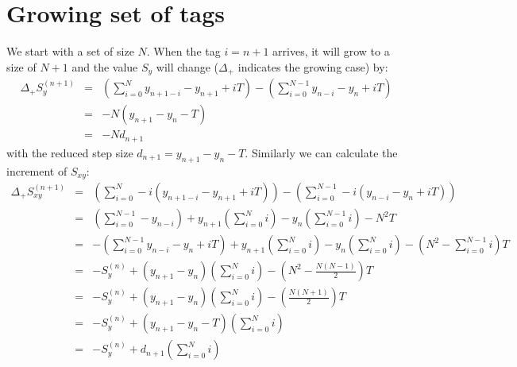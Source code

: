 \documentclass[]{scrreprt}
\begin{document}
\section{Growing set of tags}
We start with a set of size $N$. When the tag $i=n+1$ arrives, it will grow to a size of $N+1$ and the value $S_y$ will change ($\Delta_+$ indicates the growing case) by:
\begin{eqnarray}
    \Delta_+ S_y^{(n+1)} &=& \left(\sum_{i=0}^N y_{n + 1 - i} - y_{n+1} + i T\right) - \left(\sum_{i=0}^{N-1} y_{n - i} - y_n + i T\right) \label{eq:DeltaPlus_S_y_explicit} \\
    &=& - N \left(y_{n+1} - y_n - T\right) \nonumber \\
    &=& - N d_{n+1}
\end{eqnarray}
with the reduced step size $d_{n+1} = y_{n+1} - y_n - T$. Similarly we can calculate the increment of $S_{xy}$:
\begin{eqnarray}
    \Delta_+ S_{xy}^{(n+1)} &=& \left(\sum_{i=0}^N -i \left(y_{n + 1 - i} - y_{n+1} + i T\right)\right) - \left(\sum_{i=0}^{N-1} -i \left(y_{n - i} - y_n + i T\right)\right) \label{eq:DeltaPlus_S_xy_explicit} \\
    &=& \left(\sum_{i=0}^{N-1}-y_{n-i}\right) + y_{n+1} \left(\sum_{i=0}^N i\right) - y_n \left(\sum_{i=0}^{N-1} i\right) - N^2 T \nonumber \\
    &=& -\left(\sum_{i=0}^{N-1} y_{n-i} - y_n + iT\right) + y_{n+1} \left(\sum_{i=0}^N i\right) - y_n \left(\sum_{i=0}^N i\right) - \left(N^2 - \sum_{i=0}^{N-1} i\right) T \nonumber \\
    &=& -S_y^{(n)} + \left(y_{n+1} - y_n\right) \left(\sum_{i=0}^N i\right) - \left(N^2 - \frac{N(N-1)}{2}\right) T \nonumber \\
    &=& -S_y^{(n)} + \left(y_{n+1} - y_n\right) \left(\sum_{i=0}^N i\right) - \left(\frac{N(N+1)}{2}\right) T \nonumber \\
    &=& -S_y^{(n)} + \left(y_{n+1} - y_n - T\right) \left(\sum_{i=0}^N i\right) \nonumber \\
    &=& -S_y^{(n)} + d_{n+1} \left(\sum_{i=0}^N i\right)
\end{eqnarray}
\end{document}
